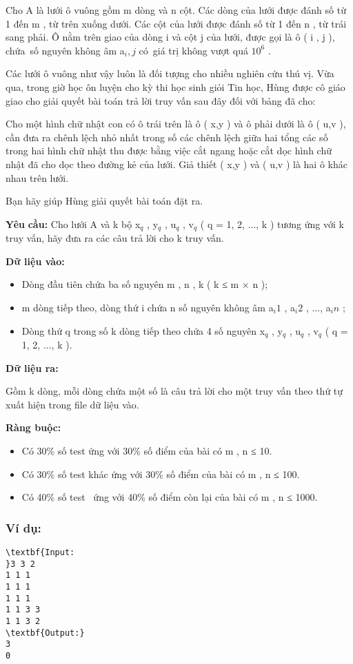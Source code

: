 

Cho A là lưới ô vuông gồm m dòng và n cột. Các dòng của lưới được đánh số từ 1 đến m , từ trên xuống dưới. Các cột của lưới được đánh số từ 1 đến n , từ trái sang phải. Ô nằm trên giao của dòng i và cột j của lưới, được gọi là ô ( i , j ), chứa số nguyên không âm a$_ i,j $ có giá trị không vượt quá $10^{6}$ .

Các lưới ô vuông như vậy luôn là đối tượng cho nhiều nghiên cứu thú vị. Vừa qua, trong giờ học ôn luyện cho kỳ thi học sinh giỏi Tin học, Hùng được cô giáo giao cho giải quyết bài toán trả lời truy vấn sau đây đối với bảng đã cho:

Cho một hình chữ nhật con có ô trái trên là ô ( x,y ) và ô phải dưới là ô ( u,v ), cần đưa ra chênh lệch nhỏ nhất trong số các chênh lệch giữa hai tổng các số trong hai hình chữ nhật thu được bằng việc cắt ngang hoặc cắt dọc hình chữ nhật đã cho dọc theo đường kẻ của lưới. Giả thiết ( x,y ) và ( u,v ) là hai ô khác nhau trên lưới.

Bạn hãy giúp Hùng giải quyết bài toán đặt ra.

\textbf{Yêu }\textbf{}\textbf{ cầu: }\textbf{} Cho lưới A và k bộ x$_ q $ , y$_ q $ , u$_ q $ , v$_ q $ ( q = 1, 2, ..., k ) tương ứng với k truy vấn, hãy đưa ra các câu trả lời cho k truy vấn.

\textbf{Dữ liệu vào: }
\begin{itemize}
	\item Dòng đầu tiên chứa ba số nguyên m , n , k ( k ≤ m × n );
	\item m dòng tiếp theo, dòng thứ i chứa n số nguyên không âm a$_i 1 $ , a$_i 2 $ , ..., a$_ in $ ;
	\item Dòng thứ q trong số k dòng tiếp theo chứa 4 số nguyên x$_ q $ , y$_ q $ , u$_ q $ , v$_ q $ ( q = 1, 2, ..., k ).
\end{itemize}

\textbf{Dữ liệu ra: }

Gồm k dòng, mỗi dòng chứa một số là câu trả lời cho một truy vấn theo thứ tự xuất hiện trong file dữ liệu vào.

\textbf{Ràng buộc: }
\begin{itemize}
	\item Có 30\% số test ứng với 30\% số điểm của bài có m , n ≤ 10.
	\item Có 30\% số test khác ứng với 30\% số điểm của bài có m , n ≤ 100.
	\item Có 40\% số test  ứng với 40\% số điểm còn lại của bài có m , n ≤ 1000.
\end{itemize}

\subsubsection{Ví dụ:}
\begin{verbatim}
\textbf{Input:
}3 3 2
1 1 1
1 1 1
1 1 1
1 1 3 3
1 1 3 2
\textbf{Output:}
3
0
\end{verbatim}
